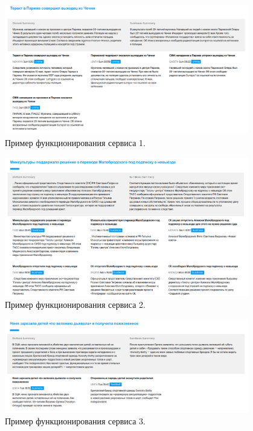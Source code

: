 \documentclass[a4paper, 14pt]{extarticle}
\begin{document}
\begin{figure}[h!]
	\centering
	\includegraphics[width=0.95\textwidth]{var1}
	\caption{Пример функционирования сервиса 1.}
	\label{var1}
\end{figure}


\begin{figure}[h!]
	\centering
	\includegraphics[width=0.95\textwidth]{var2}
	\caption{Пример функционирования сервиса 2.}
	\label{var2}
\end{figure}


\begin{figure}[h!]
	\centering
	\includegraphics[width=0.95\textwidth]{var3}
	\caption{Пример функционирования сервиса 3.}
	\label{var3}
\end{figure}
\end{document}
